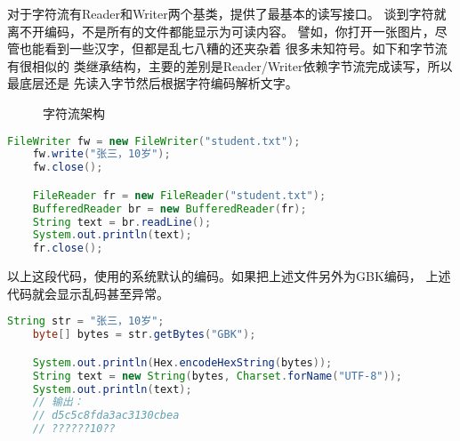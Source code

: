 对于字符流有Reader和Writer两个基类，提供了最基本的读写接口。
谈到字符就离不开编码，不是所有的文件都能显示为可读内容。
譬如，你打开一张图片，尽管也能看到一些汉字，但都是乱七八糟的还夹杂着
很多未知符号。如下和字节流有很相似的
类继承结构，主要的差别是Reader/Writer依赖字节流完成读写，所以最底层还是
先读入字节然后根据字符编码解析文字。

\begin{figure}[!htb]
	\begin{center}
	\end{center}
	\caption{字符流架构}
	\label{fig:part1_io_char_framewk}
\end{figure}

\begin{lstlisting}[language=Java]
	FileWriter fw = new FileWriter("student.txt");
	fw.write("张三，10岁");
	fw.close();

	FileReader fr = new FileReader("student.txt");
	BufferedReader br = new BufferedReader(fr);
	String text = br.readLine();
	System.out.println(text);
	fr.close();
\end{lstlisting}

以上这段代码，使用的系统默认的编码。如果把上述文件另外为GBK编码，
上述代码就会显示乱码甚至异常。

\begin{lstlisting}[language=Java]
	String str = "张三，10岁";
	byte[] bytes = str.getBytes("GBK");

	System.out.println(Hex.encodeHexString(bytes));
	String text = new String(bytes, Charset.forName("UTF-8"));
	System.out.println(text);
	// 输出：
	// d5c5c8fda3ac3130cbea
	// ??????10??
\end{lstlisting}


